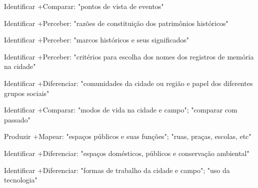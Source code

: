
 Identificar +Comparar: "pontos de vista de eventos"

 Identificar +Perceber: "razões de constituição dos patrimônios históricos"

 Identificar +Perceber: "marcos históricos e seus significados"

 Identificar +Perceber: "critérios para escolha dos nomes dos registros de memória na cidade"

 Identificar +Diferenciar: "comunidades da cidade ou região e papel dos diferentes grupos sociais"

 Identificar +Comparar: "modos de vida na cidade e campo"; "comparar com passado"

 Produzir +Mapear: "espaços públicos e suas funções"; "ruas, praças, escolas, etc"

 Identificar +Diferenciar: "espaços domésticos, públicos e conservação ambiental"

 Identificar +Diferenciar: "formas de trabalho da cidade e campo"; "uso da tecnologia"

